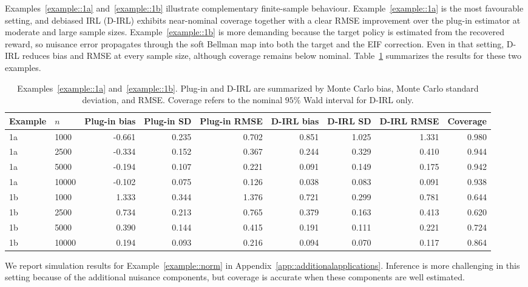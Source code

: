 \documentclass[12pt]{article}
\theoremstyle{plain}
\begin{document}
Examples~\ref{example::1a} and~\ref{example::1b} illustrate complementary
finite-sample behaviour. Example~\ref{example::1a} is the most favourable
setting, and debiased IRL (D-IRL) exhibits near-nominal coverage together with a clear RMSE
improvement over the plug-in estimator at moderate and large sample sizes.
Example~\ref{example::1b} is more demanding because the target policy is
estimated from the recovered reward, so nuisance error propagates through the
soft Bellman map into both the target and the EIF correction. Even in that
setting, D-IRL reduces bias and RMSE at every sample size, although coverage
remains below nominal.
Table~\ref{tab:simulation-main} summarizes the results for these two examples.


\begin{table}[htb]
\centering
\caption{Examples~\ref{example::1a} and~\ref{example::1b}. Plug-in and D-IRL are
summarized by Monte Carlo bias, Monte Carlo standard deviation, and RMSE.
Coverage refers to the nominal $95\%$ Wald interval for D-IRL only.}
\label{tab:simulation-main}
\begingroup
\scriptsize
\setlength{\tabcolsep}{3pt}
\begin{tabular}{llrrrrrrr}
\toprule
Example & $n$ & Plug-in bias & Plug-in SD & Plug-in RMSE & D-IRL bias & D-IRL SD & D-IRL RMSE & Coverage \\
\midrule
1a & 1000 & -0.661 & 0.235 & 0.702 & 0.851 & 1.025 & 1.331 & 0.980 \\
1a & 2500 & -0.334 & 0.152 & 0.367 & 0.244 & 0.329 & 0.410 & 0.944 \\
1a & 5000 & -0.194 & 0.107 & 0.221 & 0.091 & 0.149 & 0.175 & 0.942 \\
1a & 10000 & -0.102 & 0.075 & 0.126 & 0.038 & 0.083 & 0.091 & 0.938 \\
1b & 1000 & 1.333 & 0.344 & 1.376 & 0.721 & 0.299 & 0.781 & 0.644 \\
1b & 2500 & 0.734 & 0.213 & 0.765 & 0.379 & 0.163 & 0.413 & 0.620 \\
1b & 5000 & 0.390 & 0.144 & 0.415 & 0.191 & 0.111 & 0.221 & 0.724 \\
1b & 10000 & 0.194 & 0.093 & 0.216 & 0.094 & 0.070 & 0.117 & 0.864 \\
\bottomrule
\end{tabular}
\endgroup
\end{table}

 
We report simulation results for Example~\ref{example::norm} in
Appendix~\ref{app::additionalapplications}. Inference is more challenging in
this setting because of the additional nuisance components, but coverage is
accurate when these components are well estimated.
\end{document}
